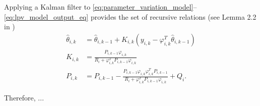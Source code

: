 \documentclass{tufte-handout}
\begin{document}
Applying a Kalman filter to \eqref{eq:parameter_variation_model}--\eqref{eq:lpv_model_output_eq} provides the set of recursive relations (see Lemma 2.2 in \cite{Ljung:1983})
\begin{align}
\hat{\theta}_{i,k} & = \hat{\theta}_{i,k-1} + K_{i,k} \left( y_{i,k} - \varphi_{i,k}^T \hat{\theta}_{i,k-1}  \right) \label{eq:theta_update} \\
K_{i,k} & = \frac{P_{i,k-1}\varphi_{i,k}}{R_i + \varphi_{i,k}^T P_{i,k-1} \varphi_{i,k}}\label{eq:Kalman_gain} \\
P_{i,k} & = P_{i,k-1} - \frac{P_{i,k-1} \varphi_{i,k} \varphi_{i,k}^T P_{i,k-1}}{R_i + \varphi_{i,k}^T P_{i,k-1} \varphi_{i,k}} + Q_i \text{.} \label{eq:P_update}
\end{align}

Therefore, ...


%


\end{document}
